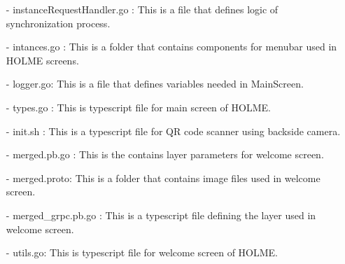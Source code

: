 \documentclass[conference]{IEEEtran}
\begin{document}
\begin{enumerate}
        \item[-] instanceRequestHandler.go : This is a file that defines logic of synchronization process.\\
        \item[-] intances.go : This is a folder that contains components for menubar used in HOLME screens.\\
        \item[-] logger.go: This is a file that defines variables needed in MainScreen.\\
        \item[-] types.go : This is typescript file for main screen of HOLME.\\
        \item[-] init.sh : This is a  typescript file for QR code scanner using backside camera.\\
        \item[-] merged.pb.go : This is the contains layer parameters for welcome screen.\\
        \item[-] merged.proto: This is a folder that contains image files used in welcome screen.\\
        \item[-] merged\_grpc.pb.go : This is a typescript file defining the layer used in welcome screen. \\
        \item[-] utils.go: This is typescript file for welcome screen of HOLME.\\
\end{enumerate}
\clearpage
\end{document}
